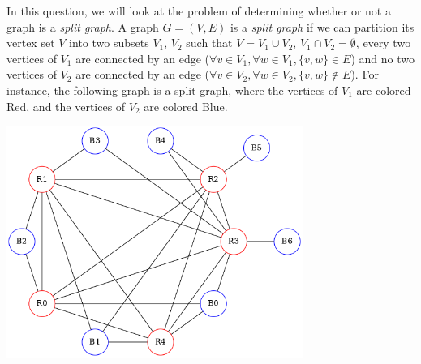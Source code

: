 In this question, we will  look at the problem of determining whether or  not a graph is a
\emph {split graph}. A graph $G = (V, E)$ is a \emph {split graph} if we can partition its
vertex set $V$ into two subsets $V_1$, $V_2$ such that $V = V_1 \cup V_2$, $V_1 \cap V_2 =
\emptyset$, every  two vertices of  $V_1$ are  connected by an  edge ($\forall v  \in V_1,
\forall w \in  V_1, \{ v, w \}  \in E$) and no  two vertices of $V_2$ are  connected by an
edge ($\forall  v \in V_2, \forall  w \in V_2,  \{ v, w  \} \notin E$). For  instance, the
following graph  is a split graph,  where the vertices of  $V_1$ are colored Red,  and the
vertices of $V_2$ are colored Blue.

\begin{center}
  \includegraphics[width=3.8in]{split-graph.png}
\end{center}

